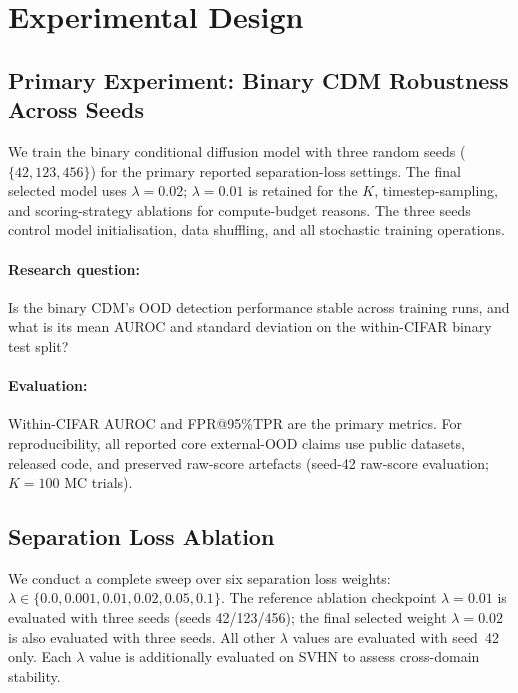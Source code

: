 
\section{Experimental Design}
\label{sec:exp:design}

\subsection{Primary Experiment: Binary CDM Robustness Across Seeds}
\label{sec:exp:design:primary}

We train the binary conditional diffusion model with three random seeds
($\{42, 123, 456\}$) for the primary reported separation-loss settings.
The final selected model uses $\lambda = 0.02$; $\lambda = 0.01$ is
retained for the $K$, timestep-sampling, and scoring-strategy ablations
for compute-budget reasons. The three seeds control model
initialisation, data shuffling, and all stochastic training operations.

\paragraph{Research question:}
Is the binary CDM's OOD detection performance stable across training
runs, and what is its mean AUROC and standard deviation on the
within-CIFAR binary test split?

\paragraph{Evaluation:}
Within-CIFAR AUROC and FPR@95\%TPR are the primary metrics. For
reproducibility, all reported core external-OOD claims use public
datasets, released code, and preserved raw-score artefacts (seed-42
raw-score evaluation; $K = 100$ MC trials).

\subsection{Separation Loss Ablation}
\label{sec:exp:design:separation}

We conduct a complete sweep over six separation loss weights:
$\lambda \in \{0.0, 0.001, 0.01, 0.02, 0.05, 0.1\}$. The reference
ablation checkpoint $\lambda = 0.01$ is evaluated with three seeds
(seeds 42/123/456); the final selected weight $\lambda = 0.02$ is also
evaluated with three seeds.
All other $\lambda$ values are evaluated with seed~42 only. Each
$\lambda$ value is additionally evaluated on SVHN to assess
cross-domain stability.

